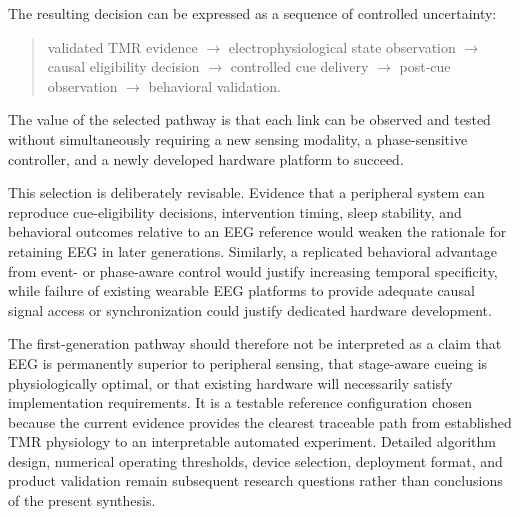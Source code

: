 The resulting decision can be expressed as a sequence of controlled
uncertainty:

\begin{quote}
    validated TMR evidence $\rightarrow$ electrophysiological state observation $\rightarrow$ causal eligibility decision $\rightarrow$ controlled cue delivery $\rightarrow$ post-cue observation $\rightarrow$ behavioral validation.
\end{quote}

The value of the selected pathway is that each link can be observed and tested
without simultaneously requiring a new sensing modality, a phase-sensitive
controller, and a newly developed hardware platform to succeed.

This selection is deliberately revisable. Evidence that a peripheral system
can reproduce cue-eligibility decisions, intervention timing, sleep stability,
and behavioral outcomes relative to an EEG reference would weaken the rationale
for retaining EEG in later generations. Similarly, a replicated behavioral
advantage from event- or phase-aware control would justify increasing temporal
specificity, while failure of existing wearable EEG platforms to provide
adequate causal signal access or synchronization could justify dedicated
hardware development.

The first-generation pathway should therefore not be interpreted as a claim
that EEG is permanently superior to peripheral sensing, that stage-aware cueing
is physiologically optimal, or that existing hardware will necessarily satisfy
implementation requirements. It is a testable reference configuration chosen
because the current evidence provides the clearest traceable path from
established TMR physiology to an interpretable automated experiment. Detailed
algorithm design, numerical operating thresholds, device selection, deployment
format, and product validation remain subsequent research questions rather than
conclusions of the present synthesis.